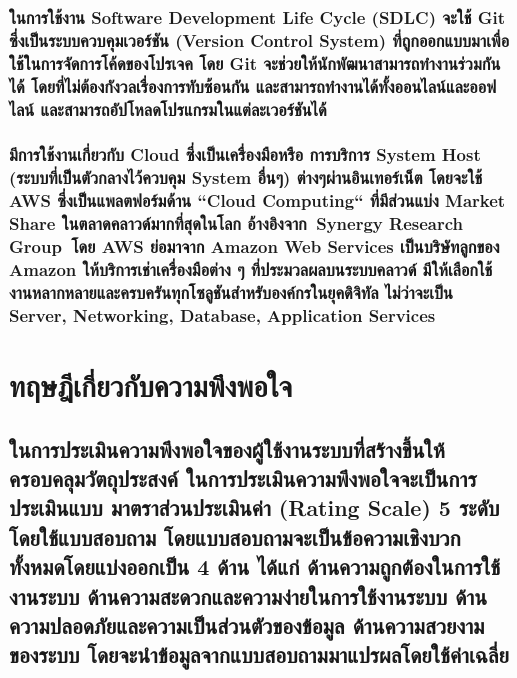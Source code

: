 \hspace{0cm}\subsubsection{ในการใช้งาน Software Development Life Cycle (SDLC) จะใช้ Git ซึ่งเป็นระบบควบคุมเวอร์ชัน (Version Control System) ที่ถูกออกแบบมาเพื่อใช้ในการจัดการโค้ดของโปรเจค โดย Git จะช่วยให้นักพัฒนาสามารถทำงานร่วมกันได้ โดยที่ไม่ต้องกังวลเรื่องการทับซ้อนกัน และสามารถทำงานได้ทั้งออนไลน์และออฟไลน์ และสามารถอัปโหลดโปรแกรมในแต่ละเวอร์ชันได้ \cite{git}}

\hspace{0cm}\subsubsection{มีการใช้งานเกี่ยวกับ Cloud ซึ่งเป็นเครื่องมือหรือ การบริการ System Host (ระบบที่เป็นตัวกลางไว้ควบคุม System อื่นๆ) ต่างๆผ่านอินเทอร์เน็ต \cite{cloud} โดยจะใช้ AWS ซึ่งเป็นแพลตฟอร์มด้าน “Cloud Computing“ ที่มีส่วนแบ่ง Market Share ในตลาดคลาวด์มากที่สุดในโลก อ้างอิงจาก Synergy Research Group โดย AWS ย่อมาจาก Amazon Web Services เป็นบริษัทลูกของ Amazon ให้บริการเช่าเครื่องมือต่าง ๆ ที่ประมวลผลบนระบบคลาวด์ มีให้เลือกใช้งานหลากหลายและครบครันทุกโซลูชันสำหรับองค์กรในยุคดิจิทัล ไม่ว่าจะเป็น Server, Networking, Database, Application Services \cite{aws}}


\section{ทฤษฎีเกี่ยวกับความพึงพอใจ}

\hspace{0cm}\subsection{ในการประเมินความพึงพอใจของผู้ใช้งานระบบที่สร้างขึ้นให้ครอบคลุมวัตถุประสงค์ ในการประเมินความพึงพอใจจะเป็นการประเมินแบบ มาตราส่วนประเมินค่า (Rating Scale) 5 ระดับโดยใช้แบบสอบถาม โดยแบบสอบถามจะเป็นข้อความเชิงบวกทั้งหมดโดยแบ่งออกเป็น 4 ด้าน ได้แก่ ด้านความถูกต้องในการใช้งานระบบ ด้านความสะดวกและความง่ายในการใช้งานระบบ ด้านความปลอดภัยและความเป็นส่วนตัวของข้อมูล ด้านความสวยงามของระบบ โดยจะนำข้อมูลจากแบบสอบถามมาแปรผลโดยใช้ค่าเฉลี่ย}

\vspace{0.25cm}


